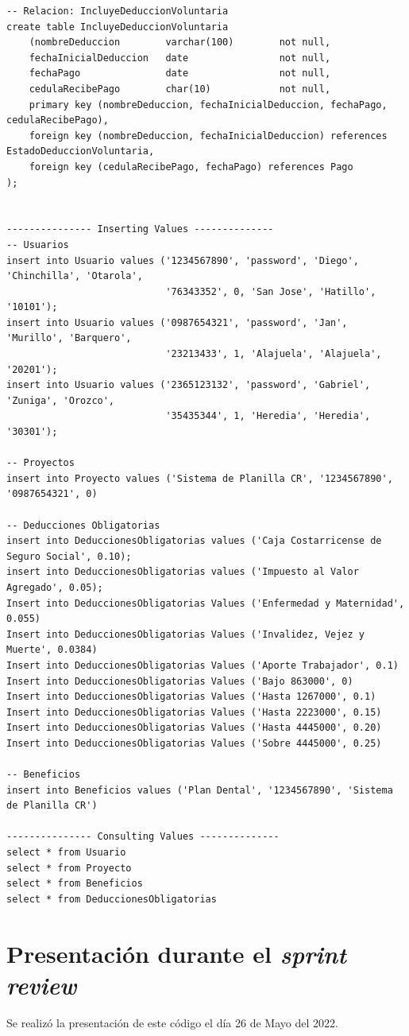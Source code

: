 \documentclass{article}
\begin{document}
\begin{verbatim}
-- Relacion: IncluyeDeduccionVoluntaria
create table IncluyeDeduccionVoluntaria
    (nombreDeduccion        varchar(100)        not null,
    fechaInicialDeduccion   date                not null,
    fechaPago               date                not null,
    cedulaRecibePago        char(10)            not null,
    primary key (nombreDeduccion, fechaInicialDeduccion, fechaPago, cedulaRecibePago),
    foreign key (nombreDeduccion, fechaInicialDeduccion) references EstadoDeduccionVoluntaria,
    foreign key (cedulaRecibePago, fechaPago) references Pago
);


--------------- Inserting Values --------------
-- Usuarios
insert into Usuario values ('1234567890', 'password', 'Diego', 'Chinchilla', 'Otarola',
                            '76343352', 0, 'San Jose', 'Hatillo', '10101');
insert into Usuario values ('0987654321', 'password', 'Jan', 'Murillo', 'Barquero',
                            '23213433', 1, 'Alajuela', 'Alajuela', '20201');
insert into Usuario values ('2365123132', 'password', 'Gabriel', 'Zuniga', 'Orozco',
                            '35435344', 1, 'Heredia', 'Heredia', '30301');

-- Proyectos
insert into Proyecto values ('Sistema de Planilla CR', '1234567890', '0987654321', 0)

-- Deducciones Obligatorias
insert into DeduccionesObligatorias values ('Caja Costarricense de Seguro Social', 0.10);
insert into DeduccionesObligatorias values ('Impuesto al Valor Agregado', 0.05);
Insert into DeduccionesObligatorias Values ('Enfermedad y Maternidad', 0.055)
Insert into DeduccionesObligatorias Values ('Invalidez, Vejez y Muerte', 0.0384)
Insert into DeduccionesObligatorias Values ('Aporte Trabajador', 0.1)
Insert into DeduccionesObligatorias Values ('Bajo 863000', 0)
Insert into DeduccionesObligatorias Values ('Hasta 1267000', 0.1)
Insert into DeduccionesObligatorias Values ('Hasta 2223000', 0.15)
Insert into DeduccionesObligatorias Values ('Hasta 4445000', 0.20)
Insert into DeduccionesObligatorias Values ('Sobre 4445000', 0.25)

-- Beneficios
insert into Beneficios values ('Plan Dental', '1234567890', 'Sistema de Planilla CR')

--------------- Consulting Values --------------
select * from Usuario
select * from Proyecto
select * from Beneficios
select * from DeduccionesObligatorias

\end{verbatim}


\section{Presentación durante el \textit{sprint review}}
Se realizó la presentación de este código el día 26 de Mayo del 2022.
\end{document}
